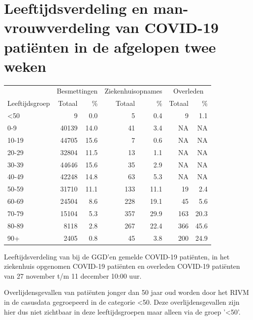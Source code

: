 \documentclass[
  english,
  man,floatsintext]{apa6}
\begin{document}
\hypertarget{leeftijdsverdeling-en-man-vrouwverdeling-van-covid-19-patiuxebnten-in-de-afgelopen-twee-weken}{%
\section{Leeftijdsverdeling en man-vrouwverdeling van COVID-19 patiënten in de afgelopen twee weken}\label{leeftijdsverdeling-en-man-vrouwverdeling-van-covid-19-patiuxebnten-in-de-afgelopen-twee-weken}}

\begin{table}
\centering\begingroup\fontsize{11}{13}\selectfont

\begin{threeparttable}
\begin{tabular}{lrrrrrr}
\toprule
\multicolumn{1}{c}{ } & \multicolumn{2}{c}{Besmettingen} & \multicolumn{2}{c}{Ziekenhuisopnames} & \multicolumn{2}{c}{Overleden} \\
\cmidrule(l{3pt}r{3pt}){2-3} \cmidrule(l{3pt}r{3pt}){4-5} \cmidrule(l{3pt}r{3pt}){6-7}
Leeftijdsgroep & Totaal & \% & Totaal & \% & Totaal & \%\\
\midrule
<50 & 9 & 0.0 & 5 & 0.4 & 9 & 1.1\\
0-9 & 40139 & 14.0 & 41 & 3.4 & NA & NA\\
10-19 & 44705 & 15.6 & 7 & 0.6 & NA & NA\\
20-29 & 32804 & 11.5 & 13 & 1.1 & NA & NA\\
30-39 & 44646 & 15.6 & 35 & 2.9 & NA & NA\\
40-49 & 42248 & 14.8 & 63 & 5.3 & NA & NA\\
50-59 & 31710 & 11.1 & 133 & 11.1 & 19 & 2.4\\
60-69 & 24504 & 8.6 & 228 & 19.1 & 45 & 5.6\\
70-79 & 15104 & 5.3 & 357 & 29.9 & 163 & 20.3\\
80-89 & 8118 & 2.8 & 267 & 22.4 & 366 & 45.6\\
90+ & 2405 & 0.8 & 45 & 3.8 & 200 & 24.9\\
\bottomrule
\end{tabular}
\begin{tablenotes}
\item[1] Leeftijdsverdeling van bij de GGD’en gemelde COVID-19 patiënten, in het ziekenhuis opgenomen COVID-19 patiënten en overleden COVID-19 patiënten van 27 november t/m 11 december 10:00 uur.
\item[2] Overlijdensgevallen van patiënten jonger dan 50 jaar oud worden door het RIVM in de casusdata gegroepeerd in de categorie <50. Deze overlijdensgevallen zijn hier dus niet zichtbaar in deze leeftijdsgroepen maar alleen via de groep '<50'.
\end{tablenotes}
\end{threeparttable}
\endgroup{}
\end{table}
\end{document}
